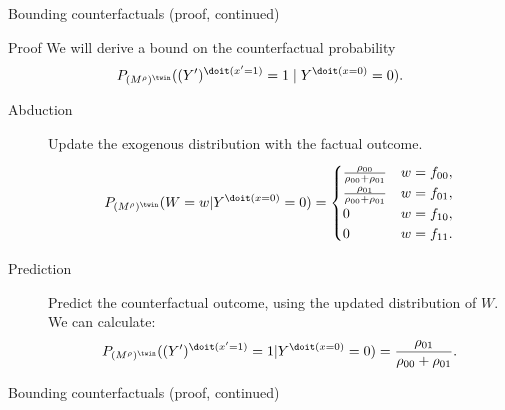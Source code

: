 \begin{frame}{Bounding counterfactuals (proof, continued)}
  \begin{block}{Proof}
  We will derive a bound on the counterfactual probability
    $$P_{(M^{\rho})^{\twin}}((Y')^{\doit(x'=1)}=1\mid Y^{\doit(x=0)}=0).$$
    \baselineskip
    \begin{description}
      \item[Abduction] Update the exogenous distribution with the factual outcome.
        {\small
        $$P_{(M^{\rho})^{\twin}}(W=w | Y^{\doit(x=0)}=0) = 
    \begin{cases}
      \frac{\rho_{00}}{\rho_{00} + \rho_{01}} & w = f_{00}, \\
      \frac{\rho_{01}}{\rho_{00} + \rho_{01}} & w = f_{01}, \\
      0 & w = f_{10}, \\
      0 & w = f_{11}.
    \end{cases}$$}
  \item[Prediction] Predict the counterfactual outcome, using the updated distribution of $W$.
    We can calculate:
        $$P_{(M^{\rho})^\twin}((Y')^{\doit(x'=1)} = 1 | Y^{\doit(x=0)}=0) = \frac{\rho_{01}}{\rho_{00} + \rho_{01}}.$$
    \end{description}
  \end{block}
\end{frame}

\begin{frame}{Bounding counterfactuals (proof, continued)}
\end{frame}

